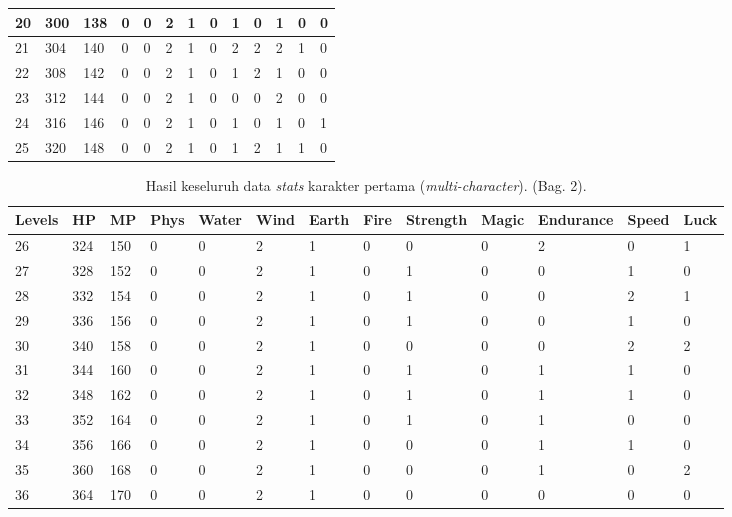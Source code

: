 \begin{sidewaystable}[!h]
\begin{tabular}{|l|l|l|l|l|l|l|l|l|l|l|l|l|}
		20 & 300 & 138 & 0 & 0 & 2 & 1 & 0 & 1 & 0 & 1 & 0 & 0 \\ \hline
		21 & 304 & 140 & 0 & 0 & 2 & 1 & 0 & 2 & 2 & 2 & 1 & 0 \\ \hline
		22 & 308 & 142 & 0 & 0 & 2 & 1 & 0 & 1 & 2 & 1 & 0 & 0 \\ \hline
		23 & 312 & 144 & 0 & 0 & 2 & 1 & 0 & 0 & 0 & 2 & 0 & 0 \\ \hline
		24 & 316 & 146 & 0 & 0 & 2 & 1 & 0 & 1 & 0 & 1 & 0 & 1 \\ \hline
		25 & 320 & 148 & 0 & 0 & 2 & 1 & 0 & 1 & 2 & 1 & 1 & 0 \\ \hline	
	\end{tabular}
\end{sidewaystable}
\clearpage


\begin{sidewaystable}[!h]
	\centering
	\caption{Hasil keseluruh data \textit{stats} karakter pertama (\textit{multi-character}). (Bag. 2).}
	\label{tb:player_all_stats_2_1}
	\vspace{1ex}
	\begin{tabular}{|l|l|l|l|l|l|l|l|l|l|l|l|l|}
		\hline
		\rowcolor[HTML]{C0C0C0} 
		\textbf{Levels} & \textbf{HP} & \textbf{MP} & \textbf{Phys} & \textbf{Water} & \textbf{Wind} & \textbf{Earth} & \textbf{Fire} & \textbf{Strength} & \textbf{Magic} & \textbf{Endurance} & \textbf{Speed} & \textbf{Luck} \\ \hline
		26 & 324 & 150 & 0 & 0 & 2 & 1 & 0 & 0 & 0 & 2 & 0 & 1 \\ \hline
		27 & 328 & 152 & 0 & 0 & 2 & 1 & 0 & 1 & 0 & 0 & 1 & 0 \\ \hline
		28 & 332 & 154 & 0 & 0 & 2 & 1 & 0 & 1 & 0 & 0 & 2 & 1 \\ \hline
		29 & 336 & 156 & 0 & 0 & 2 & 1 & 0 & 1 & 0 & 0 & 1 & 0 \\ \hline
		30 & 340 & 158 & 0 & 0 & 2 & 1 & 0 & 0 & 0 & 0 & 2 & 2 \\ \hline
		31 & 344 & 160 & 0 & 0 & 2 & 1 & 0 & 1 & 0 & 1 & 1 & 0 \\ \hline
		32 & 348 & 162 & 0 & 0 & 2 & 1 & 0 & 1 & 0 & 1 & 1 & 0 \\ \hline
		33 & 352 & 164 & 0 & 0 & 2 & 1 & 0 & 1 & 0 & 1 & 0 & 0 \\ \hline
		34 & 356 & 166 & 0 & 0 & 2 & 1 & 0 & 0 & 0 & 1 & 1 & 0 \\ \hline
		35 & 360 & 168 & 0 & 0 & 2 & 1 & 0 & 0 & 0 & 1 & 0 & 2 \\ \hline
		36 & 364 & 170 & 0 & 0 & 2 & 1 & 0 & 0 & 0 & 0 & 0 & 0 \\ \hline

\end{tabular}
\end{sidewaystable}
